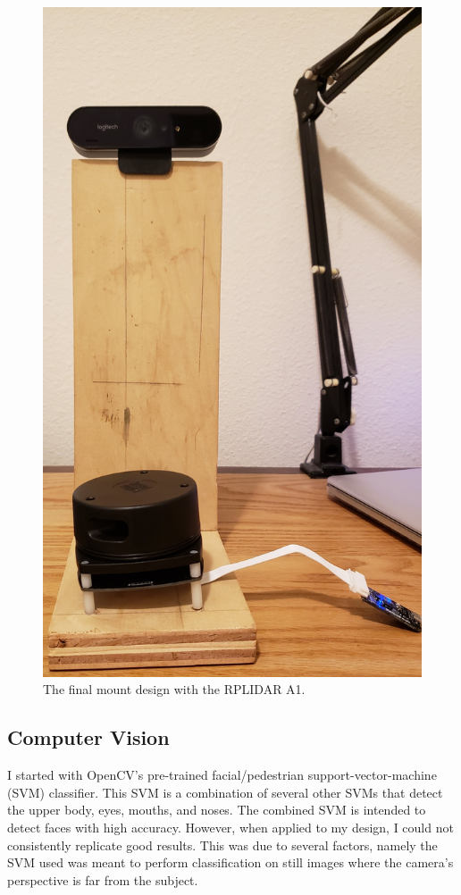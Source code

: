 \documentclass[onecolumn, draftclsnofoot,10pt, compsoc]{IEEEtran}
\makeatletter
\newcommand\captionof[1]{\def\@captype{#1}\caption}
\makeatother
\begin{document}
\begin{singlespace}
		\begin{figure}[H]
			\includegraphics[scale=0.1]{final_rplidar.jpg}
			\captionof{figure}{The final mount design with the RPLIDAR A1.}
			\label{final_rplidar}
		\end{figure}

		\subsection{Computer Vision}
			I started with OpenCV's pre-trained facial/pedestrian support-vector-machine (SVM) classifier.
			This SVM is a combination of several other SVMs that detect the upper body, eyes, mouths, and noses.
			The combined SVM is intended to detect faces with high accuracy.
			However, when applied to my design, I could not consistently replicate good results.
			This was due to several factors, namely the SVM used was meant to perform classification on still images where the camera's perspective is far from the subject.


\end{singlespace}
\end{document}
